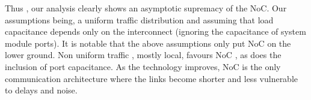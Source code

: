 Thus , our analysis clearly shows an asymptotic supremacy of the NoC.
Our assumptions being, a uniform traffic distribution and assuming
that load capacitance depends only on the interconnect (ignoring the
capacitance of system module ports). It is notable that the above
assumptions only put NoC on the lower ground. Non uniform traffic
, mostly local, favours NoC , as does the inclusion of port capacitance.
As the technology improves, NoC is the only communication architecture
where the links become shorter and less vulnerable to delays and noise. 




